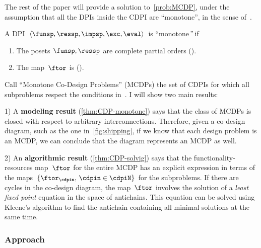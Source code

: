 
The rest of the paper will provide a solution to~\cref{prob:MCDP},
under the assumption that all the DPIs inside the CDPI are ``monotone'',
in the sense of~.
\begin{definition}
\label{def:DPI-monotone}A DPI $\left\langle \funsp,\ressp,\impsp,\exc,\eval\right\rangle $
is ``monotone\emph{''} if
\begin{enumerate}
\item The posets $\funsp,\ressp$ are complete partial orders ().
\item The map~$\ftor$ is \scottcontinuous ().
\end{enumerate}
\end{definition}


Call ``Monotone Co-Design Problems'' (MCDPs) the set of CDPIs for
which all subproblems respect the conditions in~.
 I will show two main results:

1) A \textbf{modeling result} (\cref{thm:CDP-monotone})
says that the class of MCDPs is closed with respect to arbitrary interconnections.
Therefore, given a co-design diagram, such as the one in~\cref{fig:shipping},
if we know that each design problem is an MCDP, we can conclude that
the diagram represents an MCDP as well.

2) An \textbf{algorithmic result }(\cref{thm:CDP-solvig})
says that the functionality-resources map~$\ftor$ for the entire
MCDP has an explicit expression in terms of the maps~$\{\ftor_{\cdpin},\,\cdpin\in\cdpiN\}$
for the subproblems. If there are cycles in the co-design diagram,
the map~$\ftor$ involves the solution of a\emph{ least fixed point}
equation in the space of antichains. This equation can be solved using
Kleene's algorithm to find the antichain containing all minimal solutions
at the same time.

\subsubsection{Approach}

